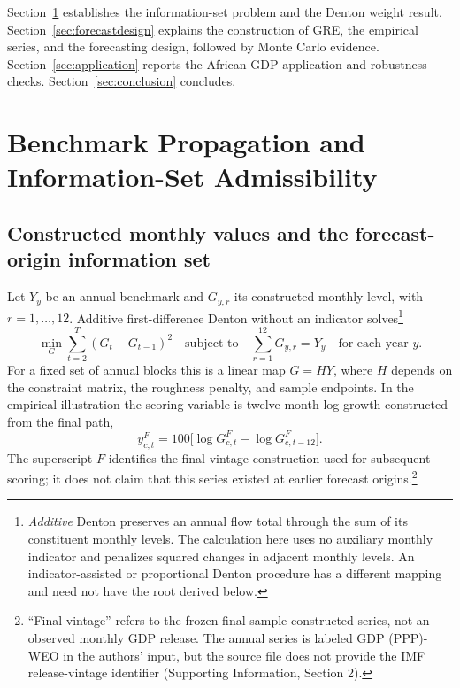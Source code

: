\documentclass[preprint,12pt,authoryear]{elsarticle}
\begin{document}
Section~\ref{sec:constructed} establishes the information-set problem and the Denton weight result. Section~\ref{sec:forecastdesign} explains the construction of GRE, the empirical series, and the forecasting design, followed by Monte Carlo evidence. Section~\ref{sec:application} reports the African GDP application and robustness checks. Section~\ref{sec:conclusion} concludes.

\section{Benchmark Propagation and Information-Set Admissibility}\label{sec:constructed}

\subsection{Constructed monthly values and the forecast-origin information set}

Let $Y_y$ be an annual benchmark and $G_{y,r}$ its constructed monthly level, with $r=1,\ldots,12$. Additive first-difference Denton without an indicator solves\footnote{\emph{Additive} Denton preserves an annual flow total through the sum of its constituent monthly levels. The calculation here uses no auxiliary monthly indicator and penalizes squared changes in adjacent monthly levels. An indicator-assisted or proportional Denton procedure has a different mapping and need not have the root derived below.}
\begin{equation}
\min_{G}\sum_{t=2}^{T}(G_t-G_{t-1})^2
\quad\text{subject to}\quad
\sum_{r=1}^{12}G_{y,r}=Y_y\quad\text{for each year }y.
\label{eq:denton}
\end{equation}
For a fixed set of annual blocks this is a linear map $G=HY$, where $H$ depends on the constraint matrix, the roughness penalty, and sample endpoints. In the empirical illustration the scoring variable is twelve-month log growth constructed from the final path,
\begin{equation}
y^F_{c,t}=100\bigl[\log G^F_{c,t}-\log G^F_{c,t-12}\bigr].
\label{eq:gdp12}
\end{equation}
The superscript $F$ identifies the final-vintage construction used for subsequent scoring; it does not claim that this series existed at earlier forecast origins.\footnote{``Final-vintage'' refers to the frozen final-sample constructed series, not an observed monthly GDP release. The annual series is labeled GDP (PPP)-WEO in the authors' input, but the source file does not provide the IMF release-vintage identifier (Supporting Information, Section 2).}
\end{document}
